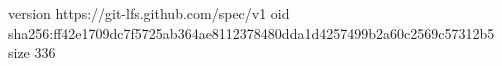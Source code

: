 version https://git-lfs.github.com/spec/v1
oid sha256:ff42e1709dc7f5725ab364ae8112378480dda1d4257499b2a60c2569c57312b5
size 336
